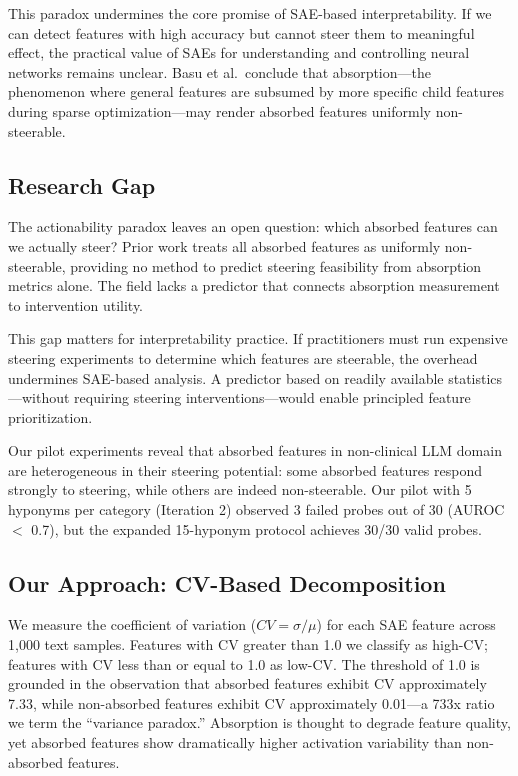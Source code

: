 \documentclass{article}
\begin{document}
This paradox undermines the core promise of SAE-based interpretability. If we can detect features with high accuracy but cannot steer them to meaningful effect, the practical value of SAEs for understanding and controlling neural networks remains unclear. Basu et al.\ conclude that absorption---the phenomenon where general features are subsumed by more specific child features during sparse optimization---may render absorbed features uniformly non-steerable.

\subsection{Research Gap}

The actionability paradox leaves an open question: which absorbed features can we actually steer? Prior work treats all absorbed features as uniformly non-steerable, providing no method to predict steering feasibility from absorption metrics alone. The field lacks a predictor that connects absorption measurement to intervention utility.

This gap matters for interpretability practice. If practitioners must run expensive steering experiments to determine which features are steerable, the overhead undermines SAE-based analysis. A predictor based on readily available statistics---without requiring steering interventions---would enable principled feature prioritization.

Our pilot experiments reveal that absorbed features in non-clinical LLM domain are heterogeneous in their steering potential: some absorbed features respond strongly to steering, while others are indeed non-steerable. Our pilot with 5 hyponyms per category (Iteration 2) observed 3 failed probes out of 30 (AUROC $<$ 0.7), but the expanded 15-hyponym protocol achieves 30/30 valid probes.

\subsection{Our Approach: CV-Based Decomposition}

We measure the coefficient of variation ($CV = \sigma / \mu$) for each SAE feature across 1,000 text samples. Features with CV greater than 1.0 we classify as high-CV; features with CV less than or equal to 1.0 as low-CV. The threshold of 1.0 is grounded in the observation that absorbed features exhibit CV approximately 7.33, while non-absorbed features exhibit CV approximately 0.01---a 733x ratio we term the ``variance paradox.'' Absorption is thought to degrade feature quality, yet absorbed features show dramatically higher activation variability than non-absorbed features.
\end{document}
